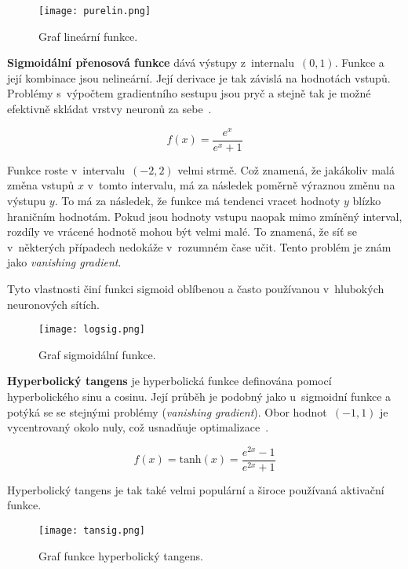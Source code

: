 \begin{figure}[H]
    \centering
    \texttt{[image: purelin.png]}
    \caption[Graf lineární funkce]{Graf lineární funkce.}
    \label{fig_lin}
\end{figure}


\textbf{Sigmoidální přenosová funkce} dává výstupy z~internalu~$(0,1)$. Funkce a její kombinace jsou nelineární. Její derivace je tak závislá na hodnotách vstupů. Problémy s~výpočtem gradientního sestupu jsou pryč a stejně tak je možné efektivně skládat vrstvy neuronů za sebe~\cite{mediumActivationFunctions}.

\begin{equation}
    f(x)=\frac{e^{x}}{e^{x}+1}
\end{equation}

Funkce roste v~intervalu~$(-2, 2)$ velmi strmě. Což znamená, že jakákoliv malá změna vstupů $x$ v~tomto intervalu, má za následek poměrně výraznou změnu na výstupu $y$. To má za následek, že funkce má tendenci vracet hodnoty $y$ blízko hraničním hodnotám. Pokud jsou hodnoty vstupu naopak mimo zmíněný interval, rozdíly ve vrácené hodnotě mohou být velmi malé. To znamená, že síť se v~některých případech nedokáže v~rozumném čase učit. Tento problém je znám jako \textit{vanishing gradient}.

Tyto vlastnosti činí funkci sigmoid oblíbenou a často používanou v~hlubokých neuronových sítích.

\begin{figure}[H]
    \centering
    \texttt{[image: logsig.png]}
    \caption[Graf sigmoidální funkce]{Graf sigmoidální funkce.}
    \label{fig_logsig}
\end{figure}


\textbf{Hyperbolický tangens} je hyperbolická funkce definována pomocí hyperbolického sinu a cosinu. Její průběh je podobný jako u~sigmoidní funkce a potýká se se stejnými problémy (\textit{vanishing gradient}). Obor hodnot~$(-1, 1)$ je vycentrovaný okolo nuly, což usnadňuje optimalizace~\cite{mediumActivationFunctions}.

\begin{equation}
    f(x)=\mathrm{tanh}(x)=\frac{e^{2x}-1}{e^{2x}+1}
\end{equation}

Hyperbolický tangens je tak také velmi populární a široce používaná aktivační funkce.

\begin{figure}[H]
    \centering
    \texttt{[image: tansig.png]}
    \caption[Graf funkce hyperbolický tangens]{Graf funkce hyperbolický tangens.}
    \label{fig_tansig}
\end{figure}


